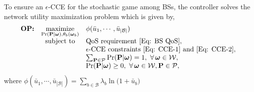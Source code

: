 \documentclass[conference]{IEEEtran}
\begin{document}
To ensure an $\epsilon$-CCE for the stochastic game among BSs, the controller solves the network utility maximization problem which is given by, %
%
%
$$\begin{array}{ccl}
{\mbox{\bf OP:}}&\underset{\Pr(\mathbf{P}|\boldsymbol{\omega}),\theta_b( \boldsymbol{\omega}_b)}{\text{maximize}} &\phi(\bar{u}_{1},\cdots,\bar{u}_{|\mathcal{B}|})
%
\\ &\mbox{subject to}&\mbox{QoS requirement \eqref{Eq: BS QoS}},
%
\\&&\mbox{$\epsilon$-CCE constraints \eqref{Eq: CCE-1} and  \eqref{Eq: CCE-2}},
%
\\&&\textstyle\sum_{\mathbf{P}\in\mathcal{P}} \Pr(\mathbf{P}|  \boldsymbol{\omega})=1,~\forall\,\boldsymbol{\omega}\in\mathcal{W},
%
\\&&\textstyle\Pr(\mathbf{P}|  \boldsymbol{\omega})\geq 0,~\forall\,\boldsymbol{\omega}\in\mathcal{W}, \mathbf{P}\in\mathcal{P},
\end{array}$$
%
%
%
where
%
%
$\phi(\bar{u}_{1},\cdots,\bar{u}_{|\mathcal{B}|})=\sum_{b\in\mathcal{B}}\lambda_b\ln\big(1+\bar{u}_b\big)$
\end{document}
